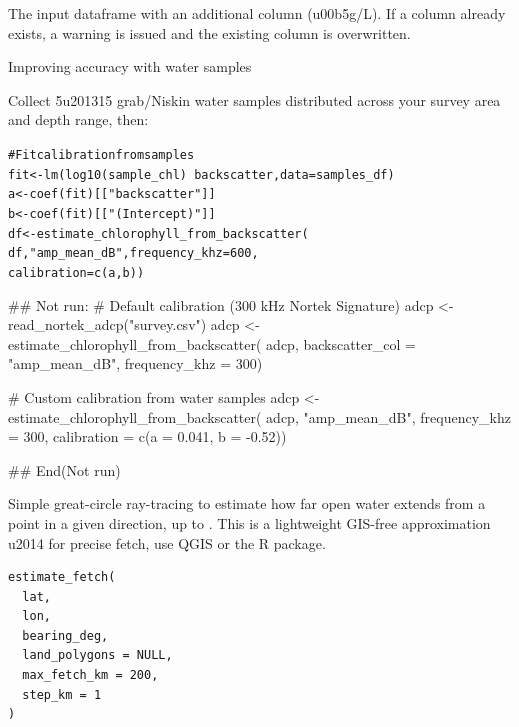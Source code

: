 \documentclass[a4paper]{book}
\begin{document}
%
\begin{Value}
The input dataframe with an additional  column
(\bsl{}u00b5g/L). If a  column already exists, a warning is issued
and the existing column is overwritten.
\end{Value}
%
\begin{Section}{Improving accuracy with water samples}

Collect 5\bsl{}u201315 grab/Niskin water samples distributed across your survey area
and depth range, then:

\begin{alltt}# Fit calibration from samples
fit  <- lm(log10(sample_chl) ~ backscatter, data = samples_df)
a    <- coef(fit)[["backscatter"]]
b    <- coef(fit)[["(Intercept)"]]
df   <- estimate_chlorophyll_from_backscatter(
          df, "amp_mean_dB", frequency_khz = 600,
          calibration = c(a, b))
\end{alltt}

\end{Section}
%
\begin{Examples}
\begin{ExampleCode}
## Not run: 
# Default calibration (300 kHz Nortek Signature)
adcp <- read_nortek_adcp("survey.csv")
adcp <- estimate_chlorophyll_from_backscatter(
          adcp, backscatter_col = "amp_mean_dB",
          frequency_khz = 300)

# Custom calibration from water samples
adcp <- estimate_chlorophyll_from_backscatter(
          adcp, "amp_mean_dB", frequency_khz = 300,
          calibration = c(a = 0.041, b = -0.52))

## End(Not run)
\end{ExampleCode}
\end{Examples}
%
\begin{Description}
Simple great-circle ray-tracing to estimate how far open water extends
from a point in a given direction, up to . This is a
lightweight GIS-free approximation \bsl{}u2014 for precise fetch, use QGIS or
the  R package.
\end{Description}
%
\begin{Usage}
\begin{verbatim}
estimate_fetch(
  lat,
  lon,
  bearing_deg,
  land_polygons = NULL,
  max_fetch_km = 200,
  step_km = 1
)
\end{verbatim}
\end{Usage}
\end{document}
